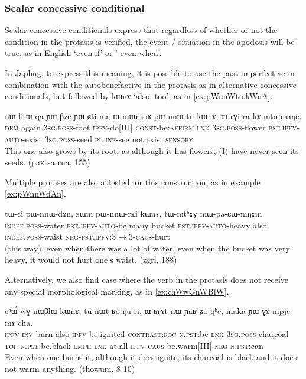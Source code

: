 \documentclass[oldfontcommands,oneside,a4paper,11pt]{article}
\newcommand{\ipa}[1]{{\phon \mbox{#1}}} %
\begin{document}
\subsubsection{Scalar concessive conditional}
Scalar concessive conditionals express that regardless of whether or not the condition in the protasis is verified, the event / situation in the apodosis will be true, as in English `even if' or ' even when'.


In Japhug, to express this meaning, it is possible to use the past imperfective in combination with the autobenefactive in the protasis as in alternative concessive conditionals, but followed by \ipa{kɯnɤ} `also, too', as in \ref{ex:pWnnWtu.kWnA}.


 \begin{exe}
\ex  \label{ex:pWnnWtu.kWnA}
\gll
\ipa{nɯ}    	\ipa{li}    	\ipa{ɯ-qa}    	\ipa{ɲɯ-βze}    	\ipa{ɲɯ-ɕti}    	\ipa{ma}    	\ipa{ɯ-mɯntoʁ}    	\ipa{pɯ-nnɯ-tu}    	\ipa{kɯnɤ,}    	\ipa{ɯ-rɣi}    	\ipa{ra}    	\ipa{kɤ-mto}    	\ipa{maŋe.}    \\
\textsc{dem} again \textsc{3sg.poss}-foot \textsc{ipfv}-do[III] \textsc{const}-be:\textsc{affirm} \textsc{lnk} \textsc{3sg.poss}-flower \textsc{pst.ipfv-auto}-exist \textsc{3sg.poss}-seed \textsc{pl} \textsc{inf}-see not.exist:\textsc{sensory} \\
\glt This one also grows by its root, as although it has flowers, (I) have never seen its seeds. (paʁtsa rna, 155)
\end{exe}
Multiple protases are also attested for this construction, as in example   \ref{ex:pWnnWdAn}.
\begin{exe}
\ex  \label{ex:pWnnWdAn}
\gll
\ipa{tɯ-ci}    	\ipa{pɯ-nnɯ-dɤn,}    	\ipa{zɯm}    	\ipa{pɯ-nnɯ-rʑi}    	\ipa{kɯnɤ,}    	\ipa{tɯ-mtʰɤɣ}    	\ipa{mɯ-pa-ɕɯ-mŋɤm}    \\
\textsc{indef.poss}-water \textsc{pst.ipfv-auto}-be.many bucket  \textsc{pst.ipfv-auto}-heavy also \textsc{indef.poss}-waist \textsc{neg-pst.ipfv:3$\rightarrow$3-caus}-hurt\\
\glt (this way), even when there was a lot of water, even when the bucket was very heavy, it would not hurt one's waist. (zgri, 188)
\end{exe}

Alternatively, we also find case where the verb in the protasis does not receive any special morphological marking, as in \ref{ex:chWwGnWBlW}.
\begin{exe}
\ex  \label{ex:chWwGnWBlW}
\gll
\ipa{cʰɯ́-wɣ-nɯβlɯ}    	\ipa{kɯnɤ,}    	\ipa{tu-nɯt}    	\ipa{ʁo}    	\ipa{ŋu}    	\ipa{ri,}    	\ipa{ɯ-ʁrɤt}    	\ipa{nɯ}    	\ipa{ɲaʁ}    	\ipa{ʑo}    	\ipa{qʰe,}    	\ipa{maka}    	\ipa{ɲɯ-ɣɤ-mpje}    	\ipa{mɤ-cha.}    	\\
\textsc{ipfv-inv}-burn also \textsc{ipfv}-be.ignited \textsc{contrast:foc} \textsc{n.pst}:be \textsc{lnk}
\textsc{3sg.poss}-charcoal \textsc{top}  \textsc{n.pst}:be.black \textsc{emph} \textsc{lnk} at.all \textsc{ipfv-caus}-be.warm[III] \textsc{neg-n.pst}:can \\
\glt Even when one burns it, although it does ignite, its charcoal is black and it does not warm anything. (thowum, 8-10)
\end{exe}
\end{document}
